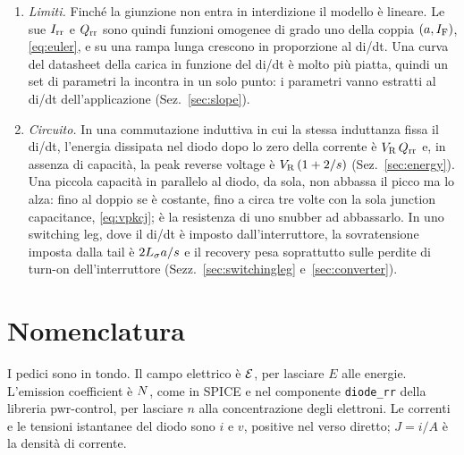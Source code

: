 \documentclass[10pt,a4paper]{scrartcl}
\let\newcommand\pdvaluedefine
\newcommand{\IF}{I_\mathrm{F}}
\newcommand{\VR}{V_\mathrm{R}}
\newcommand{\Irr}{I_\mathrm{rr}}
\newcommand{\Qrr}{Q_\mathrm{rr}}
\newcommand{\Nem}{N}                          %
\newcommand{\Ls}{L_\sigma}                    %
\newcommand{\Ef}{\mathcal{E}}                 %
\begin{document}
\begin{enumerate}
\item \emph{Limiti.} Finché la giunzione non entra in interdizione il modello è lineare. Le sue $\Irr$ e $\Qrr$ sono quindi funzioni omogenee di grado uno della coppia $(a, \IF)$, \eqref{eq:euler}, e su una rampa lunga crescono in proporzione al di/dt. Una curva del datasheet della carica in funzione del di/dt è molto più piatta, quindi un set di parametri la incontra in un solo punto: i parametri vanno estratti al di/dt dell'applicazione (Sez.~\ref{sec:slope}).
\item \emph{Circuito.} In una commutazione induttiva in cui la stessa induttanza fissa il di/dt, l'energia dissipata nel diodo dopo lo zero della corrente è $\VR\,\Qrr$ e, in assenza di capacità, la peak reverse voltage è $\VR\,(1+2/s)$ (Sez.~\ref{sec:energy}). Una piccola capacità in parallelo al diodo, da sola, non abbassa il picco ma lo alza: fino al doppio se è costante, fino a circa tre volte con la sola junction capacitance, \eqref{eq:vpkcj}; è la resistenza di uno snubber ad abbassarlo. In uno switching leg, dove il di/dt è imposto dall'interruttore, la sovratensione imposta dalla tail è $2\Ls a/s$ e il recovery pesa soprattutto sulle perdite di turn-on dell'interruttore (Sezz.~\ref{sec:switchingleg} e~\ref{sec:converter}).
\end{enumerate}

\section{Nomenclatura}
\label{sec:nomenclature}
I pedici sono in tondo. Il campo elettrico è $\Ef$, per lasciare $E$ alle energie. L'emission coefficient è $\Nem$, come in SPICE e nel componente \texttt{diode\_rr} della libreria pwr-control, per lasciare $n$ alla concentrazione degli elettroni. Le correnti e le tensioni istantanee del diodo sono $i$ e $v$, positive nel verso diretto; $J = i/A$ è la densità di corrente.
\end{document}
